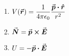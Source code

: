 

\vspace*{\fill}
\centering

\begin{enumerate}
    \item $\displaystyle V(\va*{r}) = \frac{1}{4 \pi \epsilon_0} \frac{\va*{p} \vdot \vu*{r}}{r^2}$ 
    \item $\va*{N} = \va*{p} \cross \va*{E}$
    \item $U = - \va*{p} \vdot \va*{E}$
\end{enumerate}

\centering
\vspace*{\fill}

